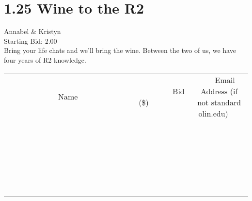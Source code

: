 \documentclass[11pt]{article}
\begin{document}
					\section*{1.25 Wine to the R2}
					Annabel \& Kristyn \\
					Starting Bid: 2.00 \\
					Bring your life chats and we'll bring the wine. Between the two of us, we have four years of R2 knowledge. \\
					[6ex]
					\begin{tabular}{c c c}
						~~~~~~~~~~~~~Name~~~~~~~~~~~~~ & ~~~~~~~~~Bid (\$)~~~~~~~~~ & ~~~Email Address (if not standard olin.edu)~~~ \\
				
 & & \\
\hline
 & & \\
\hline
 & & \\
\hline
 & & \\
\hline
 & & \\
\hline
 & & \\
\hline
 & & \\
\hline
 & & \\
\hline
 & & \\
\hline
 & & \\
\hline
 & & \\
\hline
 & & \\
\hline
 & & \\
\hline
 & & \\
\hline
 & & \\
\hline
 & & \\
\hline
 & & \\
\hline
 & & \\
\hline
 & & \\
\hline
 & & \\
\hline
 & & \\
\hline
 & & \\
\hline
 & & \\
\hline
 & & \\
\hline
 & & \\
\hline
 & & \\
\hline
					\end{tabular}
					\clearpage
				
\end{document}
